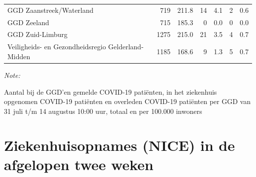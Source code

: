 \documentclass[
  english,
  man,floatsintext]{apa6}
\begin{document}
\begin{table}
\begin{threeparttable}
\begin{tabular}{lrrrrrr}
GGD Zaanstreek/Waterland & 719 & 211.8 & 14 & 4.1 & 2 & 0.6\\
GGD Zeeland & 715 & 185.3 & 0 & 0.0 & 0 & 0.0\\
GGD Zuid-Limburg & 1275 & 215.0 & 21 & 3.5 & 4 & 0.7\\
Veiligheids- en Gezondheidsregio Gelderland-Midden & 1185 & 168.6 & 9 & 1.3 & 5 & 0.7\\
\bottomrule
\end{tabular}
\begin{tablenotes}
\item \textit{Note: } 
\item Aantal bij de GGD’en gemelde COVID-19 patiënten, in het ziekenhuis opgenomen COVID-19 patiënten en overleden COVID-19 patiënten per GGD van 31 juli t/m 14 augustus 10:00 uur, totaal en per 100.000 inwoners
\end{tablenotes}
\end{threeparttable}
\endgroup{}
\end{table}

\newpage

\hypertarget{ziekenhuisopnames-nice-in-de-afgelopen-twee-weken}{%
\section{Ziekenhuisopnames (NICE) in de afgelopen twee weken}\label{ziekenhuisopnames-nice-in-de-afgelopen-twee-weken}}
\end{document}
